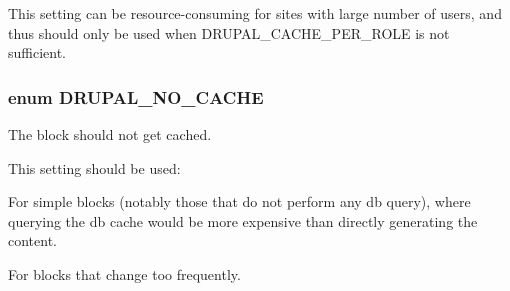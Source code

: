 This setting can be resource-\/consuming for sites with large number of users, and thus should only be used when DRUPAL\_\-CACHE\_\-PER\_\-ROLE is not sufficient. \hypertarget{group__block__caching_ga49931c05c761ec8deb074dde3eb6649c}{
\subsubsection[{DRUPAL\_\-NO\_\-CACHE}]{\setlength{\rightskip}{0pt plus 5cm}enum {\bf DRUPAL\_\-NO\_\-CACHE}}}
\label{group__block__caching_ga49931c05c761ec8deb074dde3eb6649c}
The block should not get cached.

This setting should be used:
\begin{DoxyItemize}
\item For simple blocks (notably those that do not perform any db query), where querying the db cache would be more expensive than directly generating the content.
\item For blocks that change too frequently. 
\end{DoxyItemize}